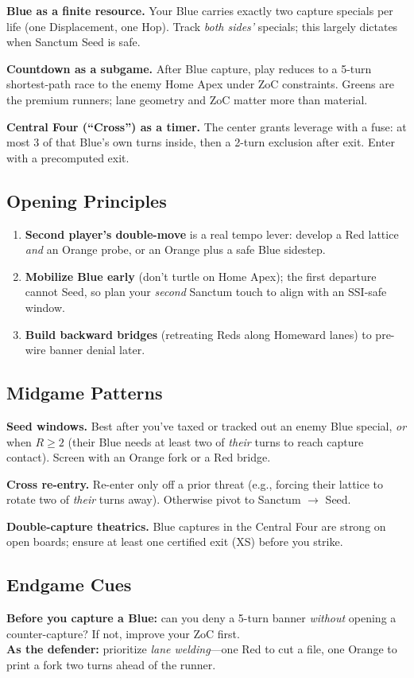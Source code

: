 \documentclass[11pt]{article}
\begin{document}
\textbf{Blue as a finite resource.} Your Blue carries exactly two capture specials per life (one Displacement, one Hop). Track \emph{both sides’} specials; this largely dictates when Sanctum Seed is safe.

\textbf{Countdown as a subgame.} After Blue capture, play reduces to a 5-turn shortest-path race to the enemy Home Apex under ZoC constraints. Greens are the premium runners; lane geometry and ZoC matter more than material.

\textbf{Central Four (“Cross”) as a timer.} The center grants leverage with a fuse: at most 3 of that Blue’s own turns inside, then a 2-turn exclusion after exit. Enter with a precomputed exit.

\bigskip

\subsection*{Opening Principles}
\begin{enumerate}
  \item \textbf{Second player’s double-move} is a real tempo lever: develop a Red lattice \emph{and} an Orange probe, or an Orange plus a safe Blue sidestep.
  \item \textbf{Mobilize Blue early} (don’t turtle on Home Apex); the first departure cannot Seed, so plan your \emph{second} Sanctum touch to align with an SSI-safe window.
  \item \textbf{Build backward bridges} (retreating Reds along Homeward lanes) to pre-wire banner denial later.
\end{enumerate}

\subsection*{Midgame Patterns}
\textbf{Seed windows.} Best after you’ve taxed or tracked out an enemy Blue special, \emph{or} when $R\!\ge\!2$ (their Blue needs at least two of \emph{their} turns to reach capture contact). Screen with an Orange fork or a Red bridge.

\textbf{Cross re-entry.} Re-enter only off a prior threat (e.g., forcing their lattice to rotate two of \emph{their} turns away). Otherwise pivot to Sanctum $\rightarrow$ Seed.

\textbf{Double-capture theatrics.} Blue captures in the Central Four are strong on open boards; ensure at least one certified exit (XS) before you strike.

\subsection*{Endgame Cues}
\textbf{Before you capture a Blue:} can you deny a 5-turn banner \emph{without} opening a counter-capture? If not, improve your ZoC first.\\
\textbf{As the defender:} prioritize \emph{lane welding}—one Red to cut a file, one Orange to print a fork two turns ahead of the runner.
\end{document}
